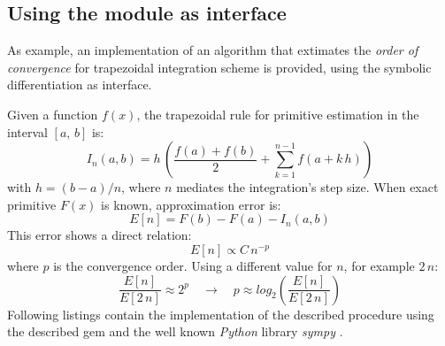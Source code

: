 \subsection{Using the module as interface}
As example, an implementation of an algorithm that extimates the \emph{order of convergence} for trapezoidal integration scheme \cite{weideman2002numerical} is provided, using the symbolic differentiation as interface.

Given a function $f(x)$, the trapezoidal rule for primitive estimation in the interval $[a,\,b]$ is:
\begin{equation}
  I_{n}(a, b) = h\, \left( \dfrac{f(a) + f(b)}{2} +
    \sum\limits_{k = 1}^{n - 1}{f \left( a + k \,h \right)} \right)
\end{equation}
with $h = (b - a) / n $, where $n$ mediates the integration's step size. When exact primitive $F(x)$ is known, approximation error is:
\begin{equation}
  E[n] = F(b) - F(a) - I_{n}(a, b)
\end{equation}
This error shows a direct relation:
\begin{equation}
  E[n] \propto C\,{n}^{-p}
\end{equation}
where $p$ is the convergence order. Using a different value for $n$, for example $2\,n$:
\begin{equation}
  \dfrac{E[n]}{E[2\,n]} \approx 2^{p} \quad \rightarrow \quad p \approx log_2 \left( \dfrac{E[n]}{E[2\,n]} \right)
\end{equation}
Following listings contain the implementation of the described procedure using the described gem and the well known \emph{Python} \cite{van2011python} library \emph{sympy} \cite{christopher_smith_2016_47274}.

\noindent%
  \begin{minipage}{.5\textwidth}
    
  \end{minipage}\hfill
  \begin{minipage}{.5\textwidth}
    
  \end{minipage}
